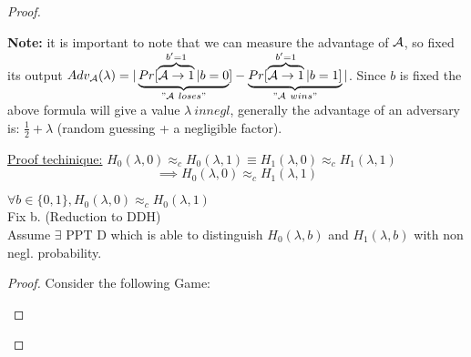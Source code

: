 \begin{proof}
\begin{figure}[h]
    \end{figure}

    \textbf{Note:} it is important to note that we can measure the advantage of $\mathcal{A}$, so fixed its output $Adv_{\A}(\lambda) = |\underbrace{Pr[\overbrace{\A\rightarrow 1}^{b'=1}|b=0}_{"\A\ loses"}]-\underbrace{Pr[\overbrace{\A\rightarrow 1}^{b'=1}|b=1]}_{"\A\ wins"}|$. Since $b$ is fixed the above formula will give a value $\lambda \ in negl$, generally the advantage of an adversary is: $\frac{1}{2}+\lambda$ (random guessing + a negligible factor). %

    

    \underline{Proof techinique:}
    $H_0(\lambda,0) \approx_c H_0(\lambda,1)\equiv H_1(\lambda,0) \approx_c H_1(\lambda,1)$
    $$\implies H_0(\lambda,0) \approx_c H_1(\lambda,1)$$

    \begin{lemma}
        $\forall b \in \{0,1\}, H_0(\lambda,0) \approx_c H_0(\lambda,1)$\\
        Fix b. (Reduction to DDH)\\
        Assume $\exists$ PPT D which is able to distinguish $H_0(\lambda,b)$ and $H_1(\lambda,b)$ with non negl. probability.
    \end{lemma}

    \begin{proof}

        Consider the following Game:

        \begin{figure}[ht!]
            \centering
            \sdinit{}
\end{figure}
\end{proof}
\end{proof}
